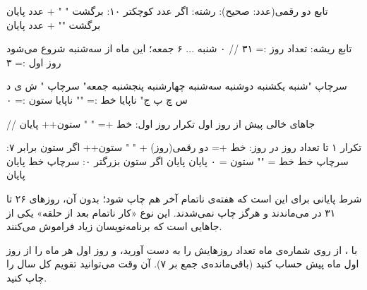 \begin{salamfa}
تابع دو رقمی(عدد: صحیح): رشته:
    اگر عدد کوچکتر ۱۰: برگشت " " + عدد پایان
    برگشت "" + عدد
پایان

تابع ریشه:
    تعداد روز := ۳۱
    // ۰ شنبه ... ۶ جمعه؛ این ماه از سه‌شنبه شروع می‌شود
    روز اول := ۳

    سرچاپ "شنبه یکشنبه دوشنبه سه‌شنبه چهارشنبه پنجشنبه جمعه"
    سرچاپ " ش   ی   د   س   چ   پ   ج"
    ناپایا خط := ""
    ناپایا ستون := ۰

    // جاهای خالی پیش از روز اول
    تکرار روز اول:
        خط += "    "
        ستون++
    پایان

    تکرار ۱ تا تعداد روز در روز:
        خط += دو رقمی(روز) + "  "
        ستون++
        اگر ستون برابر ۷:
            سرچاپ خط
            خط = ""
            ستون = ۰
        پایان
    پایان
    اگر ستون بزرگتر ۰: سرچاپ خط پایان
پایان
\end{salamfa}


شرط پایانی  برای این است که هفته‌ی ناتمام آخر هم
چاپ شود؛ بدون آن، روزهای ۲۶ تا ۳۱ در  می‌ماندند و هرگز چاپ
نمی‌شدند. این نوع «کار ناتمام بعد از حلقه» یکی از جاهایی است که
برنامه‌نویسان زیاد فراموش می‌کنند.

\begin{tip}
با ، از روی شماره‌ی ماه تعداد روزهایش را به دست آورید، و روز
اول هر ماه را از روز اول ماه پیش حساب کنید (باقی‌مانده‌ی جمع بر ۷). آن وقت
می‌توانید تقویم کل سال را چاپ کنید.
\end{tip}

